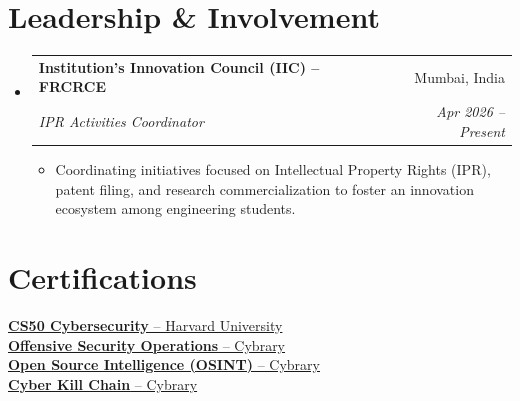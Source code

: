\documentclass[a4paper,10pt]{article}
\makeatletter
\newcommand{\resumeItem}[1]{
  \item\small{
    {#1 \vspace{-2pt}}
  }
}
\newcommand{\resumeSubheading}[4]{
  \vspace{-1pt}\item
    \begin{tabular*}{0.97\textwidth}[t]{l@{\extracolsep{\fill}}r}
      \textbf{#1} & #2 \\
      \textit{\small#3} & \textit{\small #4} \\
    \end{tabular*}\vspace{-7pt}
}
\newcommand{\resumeSubHeadingListStart}{\begin{itemize}[leftmargin=0.15in, label={}]}
\newcommand{\resumeSubHeadingListEnd}{\end{itemize}}
\newcommand{\resumeItemListStart}{\begin{itemize}}
\newcommand{\resumeItemListEnd}{\end{itemize}\vspace{-5pt}}
\makeatother
\begin{document}
\section{Leadership \& Involvement}
  \resumeSubHeadingListStart
    \resumeSubheading
      {Institution's Innovation Council (IIC) -- FRCRCE}{Mumbai, India}
      {IPR Activities Coordinator}{Apr 2026 -- Present}
      \resumeItemListStart
        \resumeItem{Coordinating initiatives focused on Intellectual Property Rights (IPR), patent filing, and research commercialization to foster an innovation ecosystem among engineering students.}
      \resumeItemListEnd
  \resumeSubHeadingListEnd

\section{Certifications}
 \begin{itemize}[leftmargin=0.15in, label={}]
    \small{\item{
     \href{https://certificates.cs50.io/de1bb71a-8a6a-499d-aec2-89b73b46ffcf.pdf?size=A4}{\underline{\textbf{CS50 Cybersecurity}} -- Harvard University}\\
     \href{https://beeth73.github.io/10611/images/Offensive_Security_Operations.png}{\underline{\textbf{Offensive Security Operations}} -- Cybrary}\\
     \href{https://beeth73.github.io/10611/images/OSINT.jpeg}{\underline{\textbf{Open Source Intelligence (OSINT)}} -- Cybrary}\\
     \href{https://beeth73.github.io/10611/images/Cyber_Kill_Chains.jpeg}{\underline{\textbf{Cyber Kill Chain}} -- Cybrary}\\
    }}
 \end{itemize}
\end{document}
